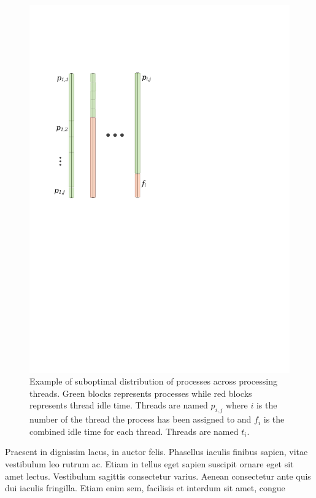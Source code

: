 \begin{figure}

\centering

\includegraphics{figures/parallel}

\label{fig:subopt-dist}

\caption{Example of suboptimal distribution of processes across processing
threads. Green blocks represents processes while red blocks represents
thread idle time. Threads are named $p_{i,j}$ where $i$ is the number
of the thread the process has been assigned to and $f_i$ is the
combined idle time for each thread. Threads are named $t_i$.}

\end{figure}
  Praesent in dignissim lacus, in auctor felis. Phasellus iaculis
  finibus sapien, vitae vestibulum leo rutrum ac. Etiam in tellus eget
  sapien suscipit ornare eget sit amet lectus. Vestibulum sagittis
  consectetur varius. Aenean consectetur ante quis dui iaculis
  fringilla. Etiam enim sem, facilisis et interdum sit amet, congue

